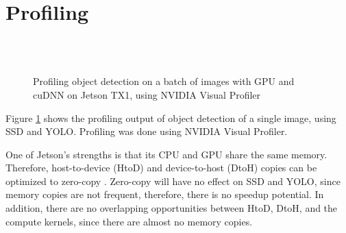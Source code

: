 \section{Profiling}
\label{sec:profiling}

\begin{figure}[t]
  \begin{center}
     \\
     \\
    \caption{Profiling object detection on a batch of images with GPU and cuDNN on Jetson TX1, using NVIDIA Visual Profiler}
    \label{fig:profile}
  \end{center}
\end{figure}

Figure \ref{fig:profile} shows the profiling output of object detection of a single image, using SSD and YOLO. Profiling was done using NVIDIA Visual Profiler.

One of Jetson's strengths is that its CPU and GPU share the same memory. Therefore, host-to-device (HtoD) and device-to-host (DtoH) copies can be optimized to zero-copy \cite{tegrazerocopy}. Zero-copy will have no effect on SSD and YOLO, since memory copies are not frequent, therefore, there is no speedup potential. In addition, there are no overlapping opportunities between HtoD, DtoH, and the compute kernels, since there are almost no memory copies.

